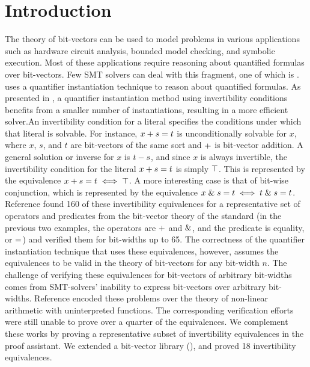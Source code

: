 \documentclass[conference]{IEEEtran}
\begin{document}
\section{Introduction}
\label{sec:intro}
The theory of bit-vectors can be used to model problems 
in various applications such as hardware circuit analysis, 
bounded model checking, and symbolic execution. Most of 
these applications require reasoning about quantified 
formulas over bit-vectors. Few SMT solvers can deal 
with this fragment, one of which is \cvcfour. \cvcfour 
uses a quantifier 
instantiation technique to reason about quantified formulas. 
As presented in \cite{b1}, a quantifier instantiation 
method using invertibility conditions benefits from a smaller 
number of instantiations, resulting in a more efficient 
solver.An invertibility condition for a literal specifies 
the conditions under which that literal is solvable. For 
instance, $x + s = t$ is unconditionally solvable 
for $x$, where $x$, $s$, and $t$ are bit-vectors of the 
same sort and $+$ is bit-vector addition. 
A general solution or inverse for $x$ is $t - s$, and 
since $x$ is always invertible, the invertibility condition 
for the literal $x + s = t$ is 
simply $\top$. This is represented by the equivalence 
$x + s = t \iff \top$. 
A more interesting case is that 
of bit-wise conjunction, which is represented by the 
equivalence 
$x \mathrel{\&} s = t \iff t \mathrel{\&} s = t$.
Reference \cite{b1} found 
160 of these invertibility equivalences for a 
representative set of operators and predicates from the 
bit-vector theory of the \smtlib standard 
(in the previous two examples, the operators are 
$+$ and $\mathrel{\&}$, 
and the predicate is equality, or $=$) and verified them 
for bit-widths up to 65. The correctness of the quantifier 
instantiation technique that uses these equivalences,
however, assumes the equivalences to be valid in the 
theory of bit-vectors for any bit-width $n$.
The challenge of verifying these equivalences for 
bit-vectors of arbitrary bit-widths comes from 
SMT-solvers' inability to express bit-vectors over
arbitrary bit-widths. Reference \cite{b2} encoded 
these problems over the theory of non-linear arithmetic 
with uninterpreted functions. The corresponding verification 
efforts were still unable to prove over a quarter of the 
equivalences. We complement these works by proving a 
representative subset of invertibility equivalences in 
the \coq proof assistant. We extended a bit-vector 
library (), and proved 18 invertibility equivalences.
\end{document}
